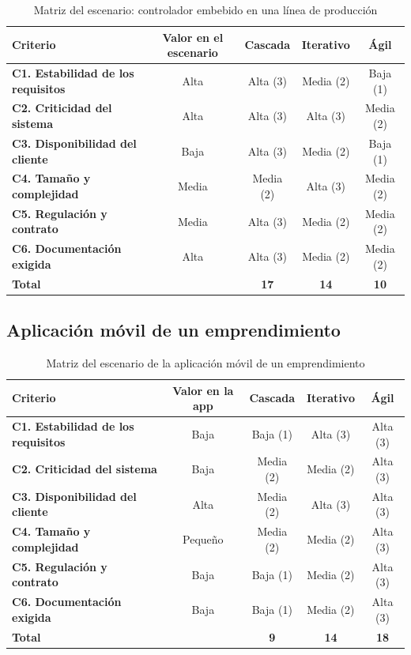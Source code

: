 \begin{table}[H]
\centering\footnotesize
\caption{Matriz del escenario: controlador embebido en una línea de producción}
\label{tab:matriz-embebido}
\begin{tabularx}{\textwidth}{@{}Ycccc@{}}
\toprule
\textbf{Criterio} & \textbf{Valor en el escenario} & \textbf{Cascada} & \textbf{Iterativo} & \textbf{Ágil}\\
\midrule
\textbf{C1. Estabilidad de los requisitos} & Alta & Alta (3) & Media (2) & Baja (1)\\
\textbf{C2. Criticidad del sistema} & Alta & Alta (3) & Alta (3) & Media (2)\\
\textbf{C3. Disponibilidad del cliente} & Baja & Alta (3) & Media (2) & Baja (1)\\
\textbf{C4. Tamaño y complejidad} & Media  & Media (2) & Alta (3) & Media (2)\\
\textbf{C5. Regulación y contrato} & Media  & Alta (3) & Media (2) & Media (2)\\
\textbf{C6. Documentación exigida} & Alta  & Alta (3) & Media (2) & Media (2)\\
\midrule
\textbf{Total} & & \textbf{17} & \textbf{14} & \textbf{10}\\
\bottomrule
\end{tabularx}
\end{table}


\subsection{Aplicación móvil de un emprendimiento}

\begin{table}[H]
\centering\footnotesize
\caption{Matriz del escenario de la aplicación móvil de un emprendimiento}
\label{tab:matriz-app}
\begin{tabularx}{\textwidth}{@{}Ycccc@{}}
\toprule
\textbf{Criterio} & \textbf{Valor en la app} & \textbf{Cascada} & \textbf{Iterativo} & \textbf{Ágil}\\
\midrule
\textbf{C1. Estabilidad de los requisitos} & Baja & Baja (1) & Alta (3) & Alta (3)\\
\textbf{C2. Criticidad del sistema} & Baja & Media (2) & Media (2) & Alta (3)\\
\textbf{C3. Disponibilidad del cliente} & Alta & Media (2) & Alta (3) & Alta (3)\\
\textbf{C4. Tamaño y complejidad} & Pequeño & Media (2) & Media (2) & Alta (3)\\
\textbf{C5. Regulación y contrato} & Baja & Baja (1) & Media (2) & Alta (3)\\
\textbf{C6. Documentación exigida} & Baja & Baja (1) & Media (2) & Alta (3)\\
\midrule
\textbf{Total} & & \textbf{9} & \textbf{14} & \textbf{18}\\
\bottomrule
\end{tabularx}
\end{table}

